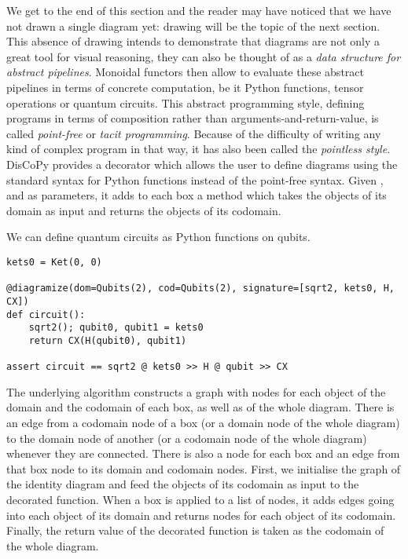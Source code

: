 We get to the end of this section and the reader may have noticed that we have not drawn a single diagram yet: drawing will be the topic of the next section.
This absence of drawing intends to demonstrate that diagrams are not only a great tool for visual reasoning, they can also be thought of as a \emph{data structure for abstract pipelines}.
Monoidal functors then allow to evaluate these abstract pipelines in terms of concrete computation, be it Python functions, tensor operations or quantum circuits.
This abstract programming style, defining programs in terms of composition rather than arguments-and-return-value, is called \emph{point-free} or \emph{tacit programming}.
Because of the difficulty of writing any kind of complex program in that way, it has also been called the \emph{pointless style}.
DisCoPy provides a  decorator which allows the user to define diagrams using the standard syntax for Python functions instead of the point-free syntax.
Given ,  and  as parameters, it adds to each box a  method which takes the objects of its domain as input and returns the objects of its codomain.

\begin{example}
We can define quantum circuits as Python functions on qubits.

\begin{verbatim}
kets0 = Ket(0, 0)

@diagramize(dom=Qubits(2), cod=Qubits(2), signature=[sqrt2, kets0, H, CX])
def circuit():
    sqrt2(); qubit0, qubit1 = kets0
    return CX(H(qubit0), qubit1)

assert circuit == sqrt2 @ kets0 >> H @ qubit >> CX
\end{verbatim}
\end{example}

The underlying algorithm constructs a graph with nodes for each object of the domain and the codomain of each box, as well as of the whole diagram.
There is an edge from a codomain node of a box (or a domain node of the whole diagram) to the domain node of another (or a codomain node of the whole diagram) whenever they are connected.
There is also a node for each box and an edge from that box node to its domain and codomain nodes.
First, we initialise the graph of the identity diagram and feed the objects of its codomain as input to the decorated function.
When a box is applied to a list of nodes, it adds edges going into each object of its domain and returns nodes for each object of its codomain.
Finally, the return value of the decorated function is taken as the codomain of the whole diagram.

